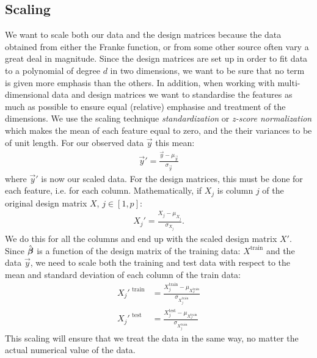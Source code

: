     \subsection{Scaling}\label{sec:scaling}
        We want to scale both our data and the design matrices because the data obtained from either the Franke function, or from some other source often vary a great deal in magnitude. Since the design matrices are set up in order to fit data to a polynomial of degree $d$ in two dimensions, we want to be sure that no term is given more emphasis than the others. In addition, when working with multi-dimensional data and design matrices we want to standardise the features as much as possible to ensure equal (relative) emphasise and treatment of the dimensions. We use the scaling technique \textit{standardization} or \textit{z-score normalization} which makes the mean of each feature equal to zero, and the their variances to be of unit length. For our observed data $\vec{y}$ this mean:
        \begin{align*}
            \vec{y}' = \frac{\vec{y}-\mu_{\vec{y}}}{\sigma_{\vec{y}}}
        \end{align*}
        where $\vec{y}'$ is now our scaled data. For the design matrices, this must be done for each feature, i.e. for each column.  Mathematically, if $X_j$ is column $j$ of the original design matrix $X$, $j\in[1,p]$:
        \begin{align*}
            X_j' = \frac{X_j-\mu_{X_j}}{\sigma_{X_j}}.
        \end{align*}
        We do this for all the columns and end up with the scaled design matrix $X'$. Since $\hat{\boldsymbol{\beta}}$ is a function of the design matrix of the training data: $X^{\text{train}}$ and the data $\vec{y}$, we need to scale both the training and test data with respect to the mean and standard deviation of each column of the train data:
        \begin{align*}
            X_j'^{\text{ train}} &= \frac{X_j^{\text{train}}-\mu_{X_J^\text{train}}}{\sigma_{X_j^{\text{train}}}} \\
            X_j'^{\text{ test}} &= \frac{X_j^{\text{test}}-\mu_{X_J^\text{train}}}{\sigma_{X_j^{\text{train}}}}
        \end{align*}
        This scaling will ensure that we treat the data in the same way, no matter the actual numerical value of the data. 



